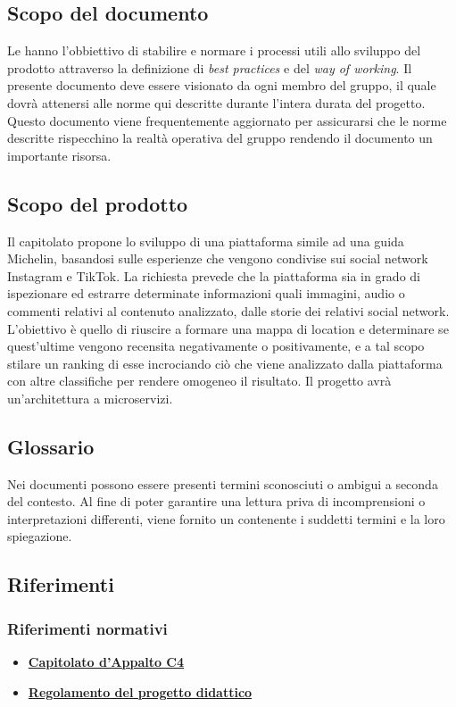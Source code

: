 \subsection{Scopo del documento}
Le \NdP{} hanno l'obbiettivo di stabilire e normare i processi utili allo sviluppo del prodotto attraverso la definizione di \emph{best practices} e del \emph{way of working}.
Il presente documento deve essere visionato da ogni membro del gruppo, il quale dovrà attenersi alle norme qui descritte durante l'intera durata del progetto.
Questo documento viene frequentemente aggiornato per assicurarsi che le norme descritte rispecchino la realtà operativa del gruppo rendendo il documento un importante risorsa.
\subsection{Scopo del prodotto}
Il capitolato propone lo sviluppo di una piattaforma simile ad una guida Michelin, basandosi sulle esperienze che vengono condivise sui social network Instagram e TikTok.
La richiesta prevede che la piattaforma sia in grado di ispezionare ed estrarre determinate informazioni quali immagini, audio o commenti relativi al contenuto analizzato, dalle storie dei relativi social network.
L'obiettivo è quello di riuscire a formare una mappa di location e determinare se quest'ultime vengono recensita negativamente o positivamente, e a tal scopo stilare un ranking di esse incrociando ciò che viene analizzato dalla piattaforma con altre classifiche per rendere omogeneo il risultato.
Il progetto avrà un'architettura a microservizi.
\subsection{Glossario}
Nei documenti possono essere presenti termini sconosciuti o ambigui a seconda del contesto. Al fine di poter garantire una lettura priva di incomprensioni o interpretazioni differenti, viene fornito un \Glo{} contenente i suddetti termini e la loro spiegazione. %
\subsection{Riferimenti}
\subsubsection{Riferimenti normativi}
\begin{itemize}
	\item
	\href{https://www.math.unipd.it/~tullio/IS-1/2021/Progetto/C4p.pdf}{\textbf{Capitolato d'Appalto C4}}
	\item
	\href{https://www.math.unipd.it/~tullio/IS-1/2021/Dispense/PD2.pdf}{\textbf{Regolamento del progetto didattico}}
\end{itemize}
